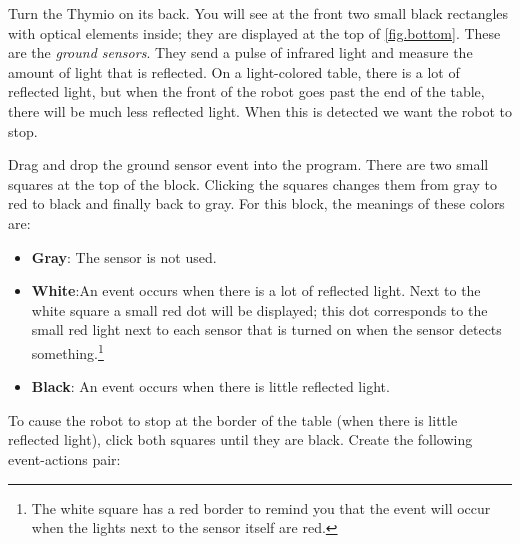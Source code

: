 
Turn the Thymio on its back. You will see at the front two small black
rectangles with optical elements inside; they are displayed at the top
of \cref{fig.bottom}. These are the \emph{ground sensors}. They send a
pulse of infrared light and measure the amount of light that is
reflected. On a light-colored table, there is a lot of reflected light,
but when the front of the robot goes past the end of the table, there
will be much less reflected light. When this is detected we want the
robot to stop.


Drag and drop the ground sensor event  into the
program. There are two small squares at the top of the block. Clicking
the squares changes them from gray to red to black and finally back to
gray. For this block, the meanings of these colors are:

\begin{itemize}

\item \textbf{Gray}: The sensor is not used.

\item \textbf{White}:An event occurs when there is a lot of reflected
light.\label{p.proximity-colors1} Next to the white square a small red
dot will be displayed; this dot corresponds to the small red light next
to each sensor that is turned on when the sensor detects
something.\footnote{The white square has a red border to remind you that
the event will occur when the lights next to the sensor itself are red.}

\item \textbf{Black}: An event occurs when there is little reflected light.

\end{itemize}


To cause the robot to stop at the border of the table (when there is
little reflected light), click both squares until they are black.
Create the following event-actions pair: 

